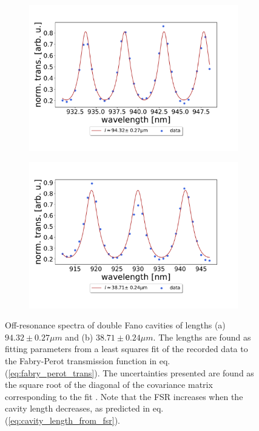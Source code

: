 \begin{figure}[h!]
    \centering
    \begin{subfigure}[b]{0.49\textwidth}
        \includegraphics[width=\textwidth]{figures/length_from_fsr_example_100um.pdf}
        \caption{}
        \label{fig:100um_FSR}
    \end{subfigure}
    \begin{subfigure}[b]{0.49\textwidth}
        \includegraphics[width=\textwidth]{figures/length_from_fsr_example_40um.pdf}
        \caption{}
        \label{fig:40um_FSR}
    \end{subfigure}
    \caption{Off-resonance spectra of double Fano cavities of lengths (a) $94.32 \pm 0.27 \mu m$ and (b) $38.71 \pm 0.24 \mu m$. The lengths are found as fitting parameters from a least squares fit of the recorded data to the Fabry-Perot transmission function in eq. (\ref{eq:fabry_perot_trans}). The uncertainties presented are found as the square root of the diagonal of the covariance matrix corresponding to the fit \cite{Hughes}. Note that the FSR increases when the cavity length decreases, as predicted in eq. (\ref{eq:cavity_length_from_fsr}).}
    \label{fig:length_from_long_scan_example}    
\end{figure}

